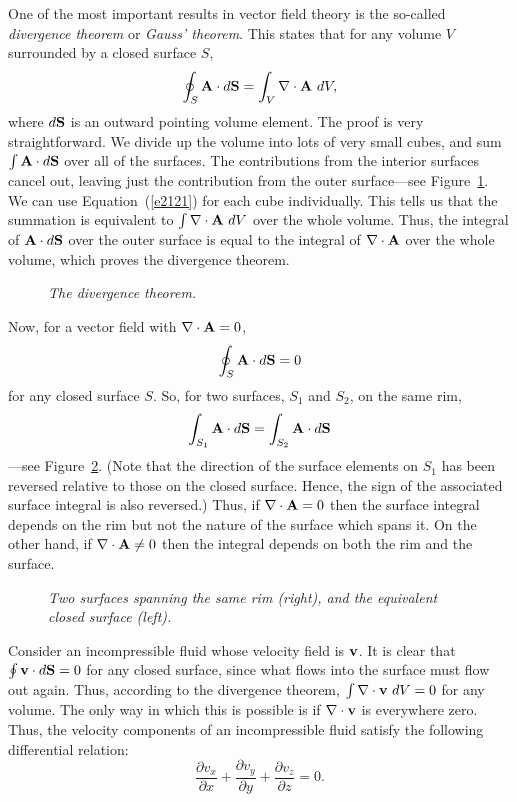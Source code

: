 One of the most important results in vector field theory is the so-called
{\em divergence theorem} or {\em Gauss' theorem}. This states that for any volume
$V$ surrounded by a closed surface $S$,
\begin{equation}
\oint_S {\bf A}\cdot d{\bf S} = \int_V \nabla\cdot{\bf A}\,\,dV,
\end{equation}
where $d{\bf S}$ is an outward pointing volume element. 
The proof is very
 straightforward. We divide up the volume into lots of very small cubes, and
sum $\int {\bf A}\cdot d{\bf S}$ over all of the surfaces. The contributions
from the interior surfaces cancel out, leaving just the contribution from the outer
surface---see Figure~\ref{f18}. We can use Equation~(\ref{e2121}) for each cube individually. This tells us that
the summation is equivalent to $\int \nabla\cdot{\bf A}\,\,dV$ over the whole
volume. Thus, the integral of ${\bf A}\cdot d{\bf S}$ over the outer surface is
equal to the integral of $\nabla\cdot{\bf A}$ over the whole volume, which
proves the divergence theorem.
\begin{figure}
\epsfysize=2.5in
\centerline{}
\caption{\em The divergence theorem.}\label{f18}
\end{figure}


Now, for a vector field with $\nabla\cdot{\bf A} = 0$,
\begin{equation}
\oint_S {\bf A}\cdot d{\bf S} =0 
\end{equation}
for any closed surface $S$. So, for two surfaces,
$S_1$ and $S_2$, on the same rim,
\begin{equation}
\int_{S_1} {\bf A}\cdot d{\bf S} = \int_{S_2} {\bf A}\cdot d{\bf S}
\end{equation}
---see Figure~\ref{f19}. (Note that the direction of the surface elements on $S_1$ has been reversed relative to those on the closed surface. Hence, the
sign of the associated surface integral is also reversed.)
Thus, if $\nabla\cdot{\bf A}=0$ then the surface integral depends on the rim but
not the nature of the surface which spans it. 
On the other hand, if $\nabla\cdot{\bf A}\neq 0 $ then the integral
depends on both the rim and the surface. 
\begin{figure}
\centerline{}
\caption{\em Two surfaces spanning the same rim (right), and the
equivalent closed surface (left).}\label{f19}
\end{figure}

Consider an incompressible fluid whose velocity field is ${\bf v}$. It is clear that
$\oint {\bf v}\cdot d{\bf S} = 0$ for any closed surface, since what flows into the
surface must flow out again. Thus, according to the divergence theorem,
$\int \nabla\cdot{\bf v}\,\,dV = 0$ for any volume. The only way in which this is
possible is if $\nabla\cdot{\bf v}$ is everywhere zero. Thus,  the velocity components
of an incompressible fluid satisfy the following differential relation:
\begin{equation}
\frac{\partial v_x}{\partial x} + \frac{\partial v_y}{\partial y} + 
\frac{\partial v_z}
{\partial z}=0.
\end{equation}


